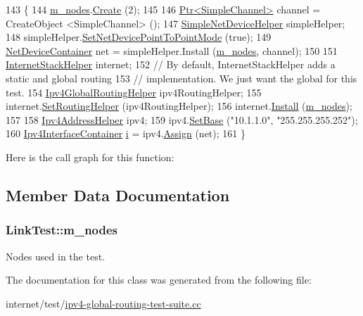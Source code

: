 \begin{DoxyCode}
143 \{
144   \hyperlink{classLinkTest_a5a290d414e995ec402de538a24976387}{m\_nodes}.\hyperlink{classns3_1_1NodeContainer_a787f059e2813e8b951cc6914d11dfe69}{Create} (2);
145 
146   \hyperlink{classns3_1_1Ptr}{Ptr<SimpleChannel>} channel = CreateObject <SimpleChannel> ();
147   \hyperlink{classns3_1_1SimpleNetDeviceHelper}{SimpleNetDeviceHelper} simpleHelper;
148   simpleHelper.\hyperlink{classns3_1_1SimpleNetDeviceHelper_a474460ba6942d4933f443a97df7d4716}{SetNetDevicePointToPointMode} (\textcolor{keyword}{true});
149   \hyperlink{classns3_1_1NetDeviceContainer}{NetDeviceContainer} net = simpleHelper.Install (\hyperlink{classLinkTest_a5a290d414e995ec402de538a24976387}{m\_nodes}, channel);
150 
151   \hyperlink{classns3_1_1InternetStackHelper}{InternetStackHelper} internet;
152   \textcolor{comment}{// By default, InternetStackHelper adds a static and global routing}
153   \textcolor{comment}{// implementation.  We just want the global for this test.}
154   \hyperlink{classns3_1_1Ipv4GlobalRoutingHelper}{Ipv4GlobalRoutingHelper} ipv4RoutingHelper;
155   internet.\hyperlink{classns3_1_1InternetStackHelper_a3e382c02df022dec79952a7eca8cd5ba}{SetRoutingHelper} (ipv4RoutingHelper);
156   internet.\hyperlink{classns3_1_1InternetStackHelper_a6645b412f31283d2d9bc3d8a95cebbc0}{Install} (\hyperlink{classLinkTest_a5a290d414e995ec402de538a24976387}{m\_nodes});
157 
158   \hyperlink{classns3_1_1Ipv4AddressHelper}{Ipv4AddressHelper} ipv4;
159   ipv4.\hyperlink{classns3_1_1Ipv4AddressHelper_acf7b16dd25bac67e00f5e25f90a9a035}{SetBase} (\textcolor{stringliteral}{"10.1.1.0"}, \textcolor{stringliteral}{"255.255.255.252"});
160   \hyperlink{classns3_1_1Ipv4InterfaceContainer}{Ipv4InterfaceContainer} \hyperlink{bernuolliDistribution_8m_a6f6ccfcf58b31cb6412107d9d5281426}{i} = ipv4.\hyperlink{classns3_1_1Ipv4AddressHelper_af8e7f4a1a7e74c00014a1eac445a27af}{Assign} (net);
161 \}
\end{DoxyCode}


Here is the call graph for this function\+:




\subsection{Member Data Documentation}
\subsubsection[{\texorpdfstring{m\+\_\+nodes}{m_nodes}}]{ Link\+Test\+::m\+\_\+nodes\hspace{0.3cm}{\ttfamily [private]}}\hypertarget{classLinkTest_a5a290d414e995ec402de538a24976387}{}\label{classLinkTest_a5a290d414e995ec402de538a24976387}


Nodes used in the test. 



The documentation for this class was generated from the following file\+:\begin{DoxyCompactItemize}
\item 
internet/test/\hyperlink{ipv4-global-routing-test-suite_8cc}{ipv4-\/global-\/routing-\/test-\/suite.\+cc}\end{DoxyCompactItemize}
